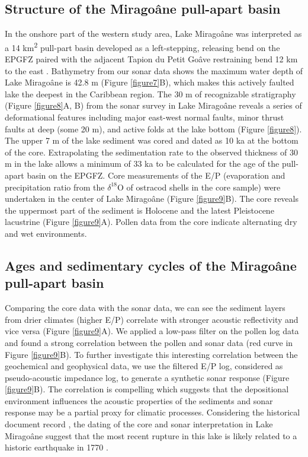 \documentclass[linenumbers,draft]{agujournal}
\begin{document}
\subsection{Structure of the Mirago\^ane pull-apart basin}
In the onshore part of the western study area, Lake Mirago\^ane was interpreted as a 14 km\textsuperscript{2} pull-part basin developed as a left-stepping, releasing bend on the EPGFZ paired with the adjacent Tapion du Petit Go\^ave restraining bend 12 km to the east \citep{cowgill2012interactive}. Bathymetry from our sonar data shows the maximum water depth of Lake Mirago\^ane is 42.8 m (Figure \ref{figure7}B), which makes this actively faulted lake the deepest \citep{higuera199910} in the Caribbean region. The 30 m of recognizable stratigraphy (Figure \ref{figure8}A, B) from the sonar survey in Lake Mirago\^ane reveals a series of deformational features including major east-west normal faults, minor thrust faults at deep (some 20 m), and active folds at the lake bottom (Figure \ref{figure8}). The upper 7 m of the lake sediment was cored and dated as 10 ka at the bottom of the core. Extrapolating the sedimentation rate to the observed thickness of 30 m in the lake allows a minimum of 33 ka to be calculated for the age of the pull-apart basin on the EPGFZ. Core measurements of the E/P (evaporation and precipitation ratio from the $\delta^{18}$O of ostracod shells in the core sample) were undertaken \citep{higuera199910} in the center of Lake Mirago\^ane (Figure \ref{figure9}B). The core reveals the uppermost part of the sediment is Holocene and the latest Pleistocene lacustrine (Figure \ref{figure9}A). Pollen data from the core indicate alternating dry and wet environments.

\subsection{Ages and sedimentary cycles of the Mirago\^ane pull-apart basin}
Comparing the core data with the sonar data, we can see the sediment layers from drier climates (higher E/P) correlate with stronger acoustic reflectivity and vice versa (Figure \ref{figure9}A). We applied a low-pass filter on the pollen log data and found a strong correlation between the pollen and sonar data (red curve in Figure \ref{figure9}B). To further investigate this interesting correlation between the geochemical and geophysical data, we use the filtered E/P log, considered as pseudo-acoustic impedance log, to generate a synthetic sonar response (Figure \ref{figure9}B). The correlation is compelling which suggests that the depositional environment influences the acoustic properties of the sediments and sonar response may be a partial proxy for climatic processes. Considering the historical document record \citep{bakun2012significant}, the dating of the core and sonar interpretation in Lake Mirago\^ane suggest that the most recent rupture in this lake is likely related to a historic earthquake in 1770 \citep{bakun2012significant}.
\end{document}

